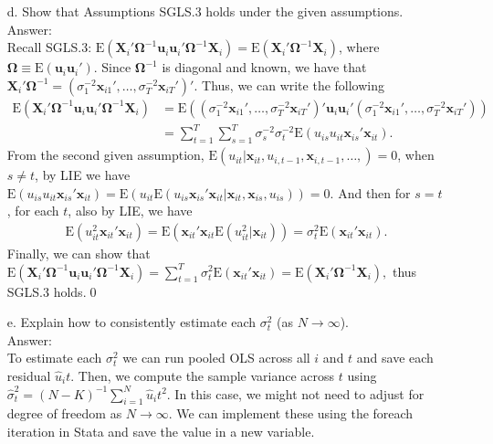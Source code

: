 \documentclass[10pt]{article}
\newcommand{\E}{\text{E}}
\begin{document}
\begin{enumerate}
\item[d.] Show that Assumptions SGLS.3 holds under the given assumptions.
\\ Answer: \\
Recall SGLS.3: $\E(\textbf{X}_i'\pmb{\Omega}^{-1}\textbf{u}_i\textbf{u}_i'\pmb{\Omega}^{-1}\textbf{X}_i)=\E(\textbf{X}_i'\pmb{\Omega}^{-1}\textbf{X}_i)$, where $\pmb{\Omega}\equiv \E(\textbf{u}_i\textbf{u}_i').$
Since $\pmb{\Omega}^{-1}$ is diagonal and known, we have that $\textbf{X}_i'\pmb{\Omega}^{-1}=(\sigma_1^{-2}\textbf{x}_{i1}',\ldots,\sigma_T^{-2}\textbf{x}_{iT}')'.$ Thus, we can write the following
\begin{align*}
    \E(\textbf{X}_i'\pmb{\Omega}^{-1}\textbf{u}_i\textbf{u}_i'\pmb{\Omega}^{-1}\textbf{X}_i)&=\E((\sigma_1^{-2}\textbf{x}_{i1}',\ldots,\sigma_T^{-2}\textbf{x}_{iT}')'\textbf{u}_i\textbf{u}_i'(\sigma_1^{-2}\textbf{x}_{i1}',\ldots,\sigma_T^{-2}\textbf{x}_{iT}'))\\
    &=\sum_{t=1}^T\sum_{s=1}^T \sigma_s^{-2}\sigma_t^{-2}\E(u_{is}u_{it}\textbf{x}_{is}'\textbf{x}_{it}).
\end{align*}
From the second given assumption, $\E(u_{it}|\textbf{x}_{it},u_{i,t-1},\textbf{x}_{i,t-1},\ldots,)=0$, when $s\neq t$, by LIE we have $\E(u_{is}u_{it}\textbf{x}_{is}'\textbf{x}_{it})=\E(u_{it}\E(u_{is}\textbf{x}_{is}'\textbf{x}_{it}|\textbf{x}_{it},\textbf{x}_{is},u_{is}))=0$. And then for $s=t$, for each $t$, also by LIE, we have
\begin{align*}
    \E(u_{it}^2\textbf{x}_{it}'\textbf{x}_{it})=\E(\textbf{x}_{it}'\textbf{x}_{it}\E(u_{it}^2|\textbf{x}_{it}))=\sigma_t^2\E(\textbf{x}_{it}'\textbf{x}_{it}).
\end{align*}
Finally, we can show that $\E(\textbf{X}_i'\pmb{\Omega}^{-1}\textbf{u}_i\textbf{u}_i'\pmb{\Omega}^{-1}\textbf{X}_i)=\sum_{t=1}^T\sigma_t^2\E(\textbf{x}_{it}'\textbf{x}_{it})=\E(\textbf{X}_i'\pmb{\Omega}^{-1}\textbf{X}_i),$ thus SGLS.3 holds.\qed

\item[e.] Explain how to consistently estimate each $\sigma_t^2$ (as $N\to \infty$).
\\ Answer: \\
To estimate each $\sigma_t^2$ we can run pooled OLS across all $i$ and $t$ and save each residual $\hat{u}_it$. Then, we compute the sample variance across $t$ using $\hat{\sigma}_t^2=(N-K)^{-1}\sum_{i=1}^N\hat{u}_it^2$. In this case, we might not need to adjust for degree of freedom as $N\to \infty$. We can implement these using the foreach iteration in Stata and save the value in a new variable.


\end{enumerate}
\end{document}
